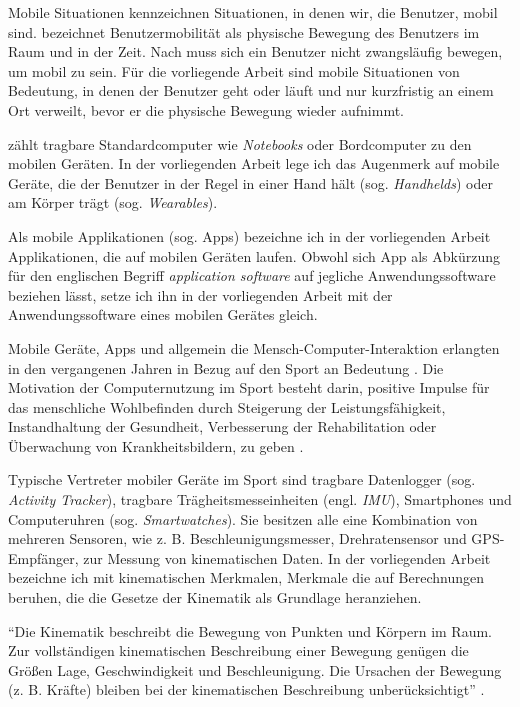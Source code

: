 Mobile Situationen kennzeichnen Situationen, in denen wir, die Benutzer, mobil sind. \citet[][S.~24~ff.]{Cooper2002} bezeichnet Benutzermobilität als physische Bewegung des Benutzers im Raum und in der Zeit. Nach \citet[][S.~7]{Roth2005} muss sich ein Benutzer nicht zwangsläufig bewegen, um mobil zu sein. Für die vorliegende Arbeit sind mobile Situationen von Bedeutung, in denen der Benutzer geht oder läuft und nur kurzfristig an einem Ort verweilt, bevor er die physische Bewegung wieder aufnimmt.

\citet[][S.~5]{Roth2005} zählt tragbare Standardcomputer wie \emph{Notebooks} oder Bordcomputer zu den mobilen Geräten. In der vorliegenden Arbeit lege ich das Augenmerk auf mobile Geräte, die der Benutzer in der Regel in einer Hand hält (sog. \emph{Handhelds}) oder am Körper trägt (sog. \emph{Wearables}).

Als mobile Applikationen (sog. Apps) bezeichne ich in der vorliegenden Arbeit Applikationen, die auf mobilen Geräten laufen. Obwohl sich App als Abkürzung für den englischen Begriff \emph{application software} auf jegliche Anwendungssoftware beziehen lässt, setze ich ihn in der vorliegenden Arbeit mit der Anwendungssoftware eines mobilen Gerätes gleich.

Mobile Geräte, Apps und allgemein die Mensch-Computer-Interaktion erlangten in den vergangenen Jahren in Bezug auf den Sport an Bedeutung \citep[vgl.][]{Nylander2014}. Die Motivation der Computernutzung im Sport besteht darin, positive Impulse für das menschliche Wohlbefinden durch Steigerung der Leistungsfähigkeit, Instandhaltung der Gesundheit, Verbesserung der Rehabilitation oder Überwachung von Krankheitsbildern, zu geben \citep[vgl.][]{DigitalSportsGroupatthePatternRecognitionLab}.

Typische Vertreter mobiler Geräte im Sport sind tragbare Datenlogger (sog. \emph{Activity Tracker}), tragbare Trägheitsmesseinheiten (engl. \emph{\ac{IMU}}), Smartphones und Computeruhren (sog. \emph{Smartwatches}). Sie besitzen alle eine Kombination von mehreren Sensoren, wie z. B. Beschleunigungsmesser, Drehratensensor und \ac{GPS}-Empfänger, zur Messung von kinematischen Daten. In der vorliegenden Arbeit bezeichne ich mit kinematischen Merkmalen, Merkmale die auf Berechnungen beruhen, die die Gesetze der Kinematik als Grundlage heranziehen.

"`Die Kinematik beschreibt die Bewegung von Punkten und Körpern im Raum. Zur vollständigen kinematischen Beschreibung einer Bewegung genügen die Größen Lage, Geschwindigkeit und Beschleunigung. Die Ursachen der Bewegung (z. B. Kräfte) bleiben bei der kinematischen Beschreibung unberücksichtigt"' \citep[][S.~57]{Disselhorst-Klug2015}.

